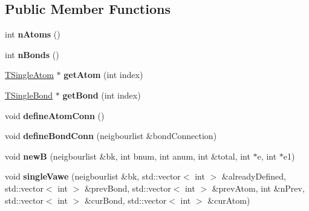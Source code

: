 \subsection*{Public Member Functions}
\begin{DoxyCompactItemize}
\item 
\hypertarget{class_open_babel_1_1_t_simple_molecule_aead9cb807f356e23a7e10a091ee0bc9e}{int {\bfseries n\-Atoms} ()}\label{class_open_babel_1_1_t_simple_molecule_aead9cb807f356e23a7e10a091ee0bc9e}

\item 
\hypertarget{class_open_babel_1_1_t_simple_molecule_ac58c83d9d318a347a18898d582fa8a2e}{int {\bfseries n\-Bonds} ()}\label{class_open_babel_1_1_t_simple_molecule_ac58c83d9d318a347a18898d582fa8a2e}

\item 
\hypertarget{class_open_babel_1_1_t_simple_molecule_abb132708a2e3d7e0359b9e8a1cbeef57}{\hyperlink{class_open_babel_1_1_t_single_atom}{T\-Single\-Atom} $\ast$ {\bfseries get\-Atom} (int index)}\label{class_open_babel_1_1_t_simple_molecule_abb132708a2e3d7e0359b9e8a1cbeef57}

\item 
\hypertarget{class_open_babel_1_1_t_simple_molecule_adfb49a4d65dabf8aa977f1390083da6c}{\hyperlink{class_open_babel_1_1_t_single_bond}{T\-Single\-Bond} $\ast$ {\bfseries get\-Bond} (int index)}\label{class_open_babel_1_1_t_simple_molecule_adfb49a4d65dabf8aa977f1390083da6c}

\item 
\hypertarget{class_open_babel_1_1_t_simple_molecule_ad7eacf2fff88192f9f8fae92ac1c05cd}{void {\bfseries define\-Atom\-Conn} ()}\label{class_open_babel_1_1_t_simple_molecule_ad7eacf2fff88192f9f8fae92ac1c05cd}

\item 
\hypertarget{class_open_babel_1_1_t_simple_molecule_a2aa9e836881e4e2b31e739e0d801b681}{void {\bfseries define\-Bond\-Conn} (neigbourlist \&bond\-Connection)}\label{class_open_babel_1_1_t_simple_molecule_a2aa9e836881e4e2b31e739e0d801b681}

\item 
\hypertarget{class_open_babel_1_1_t_simple_molecule_a68482dd2bd0e1365853e6ce0104575a5}{void {\bfseries new\-B} (neigbourlist \&bk, int bnum, int anum, int \&total, int $\ast$e, int $\ast$e1)}\label{class_open_babel_1_1_t_simple_molecule_a68482dd2bd0e1365853e6ce0104575a5}

\item 
\hypertarget{class_open_babel_1_1_t_simple_molecule_a58fdb96eb497548767d1732dd6ce1949}{void {\bfseries single\-Vawe} (neigbourlist \&bk, std\-::vector$<$ int $>$ \&already\-Defined, std\-::vector$<$ int $>$ \&prev\-Bond, std\-::vector$<$ int $>$ \&prev\-Atom, int \&n\-Prev, std\-::vector$<$ int $>$ \&cur\-Bond, std\-::vector$<$ int $>$ \&cur\-Atom)}\label{class_open_babel_1_1_t_simple_molecule_a58fdb96eb497548767d1732dd6ce1949}


\end{DoxyCompactItemize}

